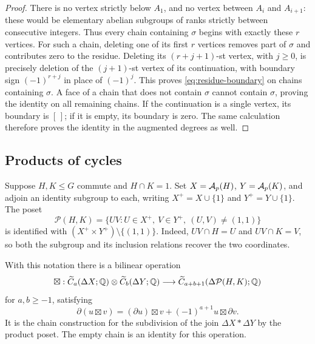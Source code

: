 \begin{proof}
There is no vertex strictly below $A_1$, and no vertex between
$A_i$ and $A_{i+1}$: these would be elementary abelian subgroups of
ranks strictly between consecutive integers.  Thus every chain
containing $\sigma$ begins with exactly these $r$ vertices.
For such a chain, deleting one of its first $r$ vertices removes part
of $\sigma$ and contributes zero to the residue.  Deleting its
$(r+j+1)$-st vertex, with $j\ge0$, is precisely deletion of the
$(j+1)$-st vertex of its continuation, with boundary sign
$(-1)^{r+j}$ in place of $(-1)^j$.  This proves
\eqref{eq:residue-boundary} on chains containing $\sigma$.
A face of a chain that does not contain $\sigma$ cannot contain
$\sigma$, proving the identity on all remaining chains.  If the
continuation is a single vertex, its boundary is $[\,]$; if it is
empty, its boundary is zero.  The same calculation therefore proves
the identity in the augmented degrees as well.
\end{proof}

\subsection{Products of cycles}

Suppose $H,K\le G$ commute and $H\cap K=1$.  Set
$X=\mathcal A_p(H)$, $Y=\mathcal A_p(K)$, and adjoin an identity subgroup to each,
writing $X^+=X\cup\{1\}$ and $Y^+=Y\cup\{1\}$.  The poset
\[
 \mathcal P(H,K)
   =\{UV:U\in X^+,\ V\in Y^+,\ (U,V)\ne(1,1)\}
\]
is identified with $(X^+\times Y^+)\setminus\{(1,1)\}$.
Indeed, $UV\cap H=U$ and $UV\cap K=V$, so both the subgroup and
its inclusion relations recover the two coordinates.

\begin{lemma}\label{lem:product-shuffle}
With this notation there is a bilinear operation
\[
 \boxtimes:\widetilde C_a(\Delta X;\mathbb Q)
       \otimes\widetilde C_b(\Delta Y;\mathbb Q)
       \longrightarrow
       \widetilde C_{a+b+1}(\Delta\mathcal P(H,K);\mathbb Q)
\]
for $a,b\ge-1$, satisfying
\begin{equation}\label{eq:product-boundary}
 \partial(u\boxtimes v)
   =(\partial u)\boxtimes v+(-1)^{a+1}u\boxtimes\partial v.
\end{equation}
It is the chain construction for the subdivision of the join
$\Delta X*\Delta Y$ by the product poset.  The empty chain is an
identity for this operation.
\end{lemma}

